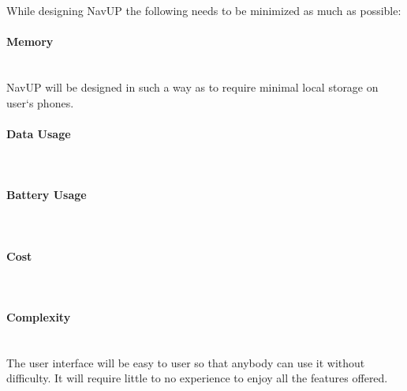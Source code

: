 While designing NavUP the following needs to be minimized as much as possible:


\paragraph{Memory}
\mbox{}\\
NavUP will be designed in such a way as to require minimal local storage on user`s phones.

\paragraph{Data Usage}
\mbox{}\\

\paragraph{Battery Usage}
\mbox{}\\

\paragraph{Cost}
\mbox{}\\

\paragraph{Complexity}
\mbox{}\\
The user interface will be easy to user so that anybody can use it without difficulty. 
It will require little to no experience to enjoy all the features offered.